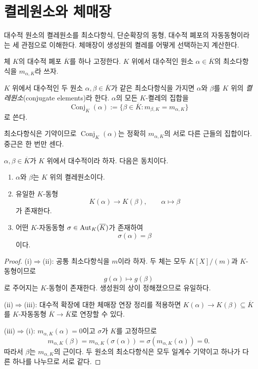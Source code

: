 \section{켤레원소와 체매장}
\label{sec:conjugates-embeddings}

\begin{learninggoal}
대수적 원소의 켤레원소를 최소다항식, 단순확장의 동형, 대수적 폐포의 자동동형이라는 세 관점으로 이해한다. 체매장이 생성원의 켤레를 어떻게 선택하는지 계산한다.
\end{learninggoal}

체 $K$의 대수적 폐포 $\overline K$를 하나 고정한다. $K$ 위에서 대수적인 원소 $\alpha\in\overline K$의 최소다항식을 $m_{\alpha,K}$라 쓰자.

\begin{definition}[켤레원소]
$K$ 위에서 대수적인 두 원소 $\alpha,\beta\in\overline K$가 같은 최소다항식을 가지면 $\alpha$와 $\beta$를 $K$ 위의 \emph{켤레원소}(conjugate elements)라 한다. $\alpha$의 모든 $K$-켤레의 집합을
\[
  \operatorname{Conj}_K(\alpha)
  :=\{\beta\in\overline K:m_{\beta,K}=m_{\alpha,K}\}
\]
로 쓴다.
\end{definition}

최소다항식은 기약이므로 $\operatorname{Conj}_K(\alpha)$는 정확히 $m_{\alpha,K}$의 서로 다른 근들의 집합이다. 중근은 한 번만 센다.

\begin{theorem}
$\alpha,\beta\in\overline K$가 $K$ 위에서 대수적이라 하자. 다음은 동치이다.
\begin{enumerate}[label=(\roman*)]
  \item $\alpha$와 $\beta$는 $K$ 위의 켤레원소이다.
  \item 유일한 $K$-동형
  \[
    K(\alpha)\longrightarrow K(\beta),
    \qquad \alpha\longmapsto\beta
  \]
  가 존재한다.
  \item 어떤 $K$-자동동형 $\sigma\in\operatorname{Aut}_K(\overline K)$가 존재하여
  \[
    \sigma(\alpha)=\beta
  \]
  이다.
\end{enumerate}
\end{theorem}

\begin{proof}
(i)$\Rightarrow$(ii): 공통 최소다항식을 $m$이라 하자. 두 체는 모두 $K[X]/(m)$과 $K$-동형이므로
\[
  g(\alpha)\longmapsto g(\beta)
\]
로 주어지는 $K$-동형이 존재한다. 생성원의 상이 정해졌으므로 유일하다.

(ii)$\Rightarrow$(iii): 대수적 확장에 대한 체매장 연장 정리를 적용하면 $K(\alpha)\to K(\beta)\subseteq\overline K$를 $K$-자동동형 $\overline K\to\overline K$로 연장할 수 있다.

(iii)$\Rightarrow$(i): $m_{\alpha,K}(\alpha)=0$이고 $\sigma$가 $K$를 고정하므로
\[
  m_{\alpha,K}(\beta)
  =m_{\alpha,K}(\sigma(\alpha))
  =\sigma(m_{\alpha,K}(\alpha))=0.
\]
따라서 $\beta$는 $m_{\alpha,K}$의 근이다. 두 원소의 최소다항식은 모두 일계수 기약이고 하나가 다른 하나를 나누므로 서로 같다.
\end{proof}

